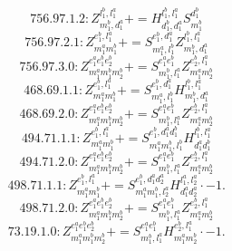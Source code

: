 \documentclass[letterpaper,10pt,fleqn,leqno,onecolumn]{article}
\begin{document}
\begin{equation} \;\;\;\;\;\;  756.97.1.2: Z^{l_{1}^{b},l_{1}^{a}}_{m_{1}^{b},d_{1}^{a}}+=H^{l_{1}^{b},l_{1}^{a}}_{d_{1}^{b},d_{1}^{a}}S^{d_{1}^{b}}_{m_{1}^{b}} \end{equation}
\begin{equation} \;\;\;\;\;\;  756.97.2.1: Z^{e_{1}^{b},l_{1}^{a}}_{m_{1}^{a}m_{1}^{b}}+=S^{e_{1}^{b},d_{1}^{a}}_{m_{1}^{a},l_{1}^{b}}Z^{l_{1}^{b},l_{1}^{a}}_{m_{1}^{b},d_{1}^{a}} \end{equation}
\begin{equation} \;\;\;\;\;\;  756.97.3.0: Z^{e_{1}^{a}e_{1}^{b}e_{2}^{b}}_{m_{1}^{a}m_{1}^{b}m_{2}^{b}}+=S^{e_{1}^{a}e_{1}^{b}}_{m_{1}^{b},l_{1}^{a}}Z^{e_{2}^{b},l_{1}^{a}}_{m_{1}^{a}m_{2}^{b}} \end{equation}
\begin{equation} \;\;\;\;\;\;  468.69.1.1: Z^{e_{1}^{b},l_{1}^{a}}_{m_{1}^{a}m_{1}^{b}}+=S^{e_{1}^{b},d_{1}^{a}}_{m_{1}^{a},l_{1}^{b}}H^{l_{1}^{b},l_{1}^{a}}_{m_{1}^{b},d_{1}^{a}} \end{equation}
\begin{equation} \;\;\;\;\;\;  468.69.2.0: Z^{e_{1}^{a}e_{1}^{b}e_{2}^{b}}_{m_{1}^{a}m_{1}^{b}m_{2}^{b}}+=S^{e_{1}^{a}e_{1}^{b}}_{m_{1}^{b},l_{1}^{a}}Z^{e_{2}^{b},l_{1}^{a}}_{m_{1}^{a}m_{2}^{b}} \end{equation}
\begin{equation} \;\;\;\;\;\;  494.71.1.1: Z^{e_{1}^{b},l_{1}^{a}}_{m_{1}^{a}m_{1}^{b}}+=S^{e_{1}^{b},d_{1}^{a}d_{1}^{b}}_{m_{1}^{a}m_{1}^{b},l_{1}^{b}}H^{l_{1}^{b},l_{1}^{a}}_{d_{1}^{a}d_{1}^{b}} \end{equation}
\begin{equation} \;\;\;\;\;\;  494.71.2.0: Z^{e_{1}^{a}e_{1}^{b}e_{2}^{b}}_{m_{1}^{a}m_{1}^{b}m_{2}^{b}}+=S^{e_{1}^{a}e_{1}^{b}}_{m_{1}^{b},l_{1}^{a}}Z^{e_{2}^{b},l_{1}^{a}}_{m_{1}^{a}m_{2}^{b}} \end{equation}
\begin{equation} \;\;\;\;\;\;  498.71.1.1: Z^{e_{1}^{b},l_{1}^{a}}_{m_{1}^{a}m_{1}^{b}}+=S^{e_{1}^{b},d_{1}^{a}d_{2}^{a}}_{m_{1}^{a}m_{1}^{b},l_{2}^{a}}H^{l_{1}^{a},l_{2}^{a}}_{d_{1}^{a}d_{2}^{a}}\cdot -1. \end{equation}
\begin{equation} \;\;\;\;\;\;  498.71.2.0: Z^{e_{1}^{a}e_{1}^{b}e_{2}^{b}}_{m_{1}^{a}m_{1}^{b}m_{2}^{b}}+=S^{e_{1}^{a}e_{1}^{b}}_{m_{1}^{b},l_{1}^{a}}Z^{e_{2}^{b},l_{1}^{a}}_{m_{1}^{a}m_{2}^{b}} \end{equation}
\begin{equation} \;\;\;\;\;\;  73.19.1.0: Z^{e_{1}^{a}e_{1}^{b}e_{2}^{b}}_{m_{1}^{a}m_{1}^{b}m_{2}^{b}}+=S^{e_{1}^{a}e_{1}^{b}}_{m_{1}^{b},l_{1}^{a}}H^{e_{2}^{b},l_{1}^{a}}_{m_{1}^{a}m_{2}^{b}}\cdot -1. \end{equation}
\end{document}
